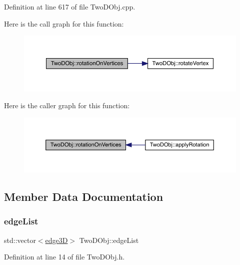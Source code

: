 Definition at line 617 of file Two\+D\+Obj.\+cpp.

Here is the call graph for this function\+:
\nopagebreak
\begin{figure}[H]
\begin{center}
\leavevmode
\includegraphics[width=350pt]{class_two_d_obj_a68343b4431fd7282dde6fabbf7a231ce_cgraph}
\end{center}
\end{figure}
Here is the caller graph for this function\+:
\nopagebreak
\begin{figure}[H]
\begin{center}
\leavevmode
\includegraphics[width=350pt]{class_two_d_obj_a68343b4431fd7282dde6fabbf7a231ce_icgraph}
\end{center}
\end{figure}


\subsection{Member Data Documentation}
\mbox{\label{class_two_d_obj_a48a318d3eac2dc2f2997aa4a4dc2450f}} 
\subsubsection{\texorpdfstring{edge\+List}{edgeList}}
{\footnotesize\ttfamily std\+::vector$<$\mbox{\hyperlink{structedge3_d}{edge3D}}$>$ Two\+D\+Obj\+::edge\+List}



Definition at line 14 of file Two\+D\+Obj.\+h.

\mbox{\label{class_two_d_obj_a57fb6cdcb9c4b706651b86785cc43381}} 
